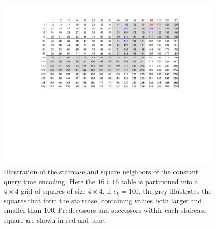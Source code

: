 \begin{figure}
\centering
\includegraphics[trim={4cm 10cm 3cm 2cm},clip,width=\linewidth]{figures/stair}
\caption{Illustration of the staircase and square neighbors of the constant query time encoding. Here the $16\times16$ table is partitioned into a $4\times 4$ grid of squares of size $4\times 4$. If $c_k=100$, the grey illustrates the squares that form the staircase, containing values both larger and smaller than 100. Predecessors and successors within each staircase square are shown in red and blue.}
\end{figure}

